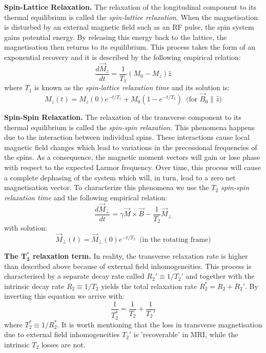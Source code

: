 \hfill

\textbf{Spin-Lattice Relaxation.} The relaxation of the longitudinal component to its thermal equilibrium is called the \textit{spin-lattice relaxation}. 
When the magnetisation is disturbed by an external magnetic field such as an RF pulse, the spin system gains potential energy.
By releasing this energy back to the lattice, the magnetisation then returns to its equilibrium.
This process takes the form of an exponential recovery and it is described by the following empirical relation:
\begin{equation}\label{eq:411}
    \frac{d \vec{M}_{z}}{dt} = \frac{1}{T_1} (M_0 - M_z) \hat{z}
\end{equation}
where $T_1$ is known as the \textit{spin-lattice relaxation time} and its solution is:
\begin{equation}\label{eq:413}
    M_z(t) = M_z(0) e^{-t/T_1} + M_0(1-e^{-t/T_1}) \, \text{ (for } \vec{B}_0 \parallel \hat{z} \text{)}
\end{equation}

\hfill

\textbf{Spin-Spin Relaxation.} The relaxation of the transverse component to its thermal equilibrium is called the \textit{spin-spin relaxation}. 
This phenomena happens due to the interaction between individual spins.
These interactions cause local magnetic field changes which lead to variations in the precessional frequencies of the spins.
As a consequence, the magnetic moment vectors will gain or lose phase with respect to the expected Larmor frequency.
Over time, this process will cause a complete dephasing of the system which will, in turn, lead to a zero net magnetisation vector.
To characterize this phenomena we use the $T_2$ \textit{spin-spin relaxation time} and the following empirical relation:
\begin{equation}\label{eq:412}
    \frac{d \vec{M}_{\perp}}{dt} = \gamma \vec{M} \times \vec{B} - \frac{1}{T_2} \vec{M}_{\perp}
\end{equation}
with solution:
\begin{equation}\label{eq:414}
    \vec{M}_{\perp}(t) = \vec{M}_{\perp}(0) e^{-t/T_2} \, \text{ (in the rotating frame)}
\end{equation}

\hfill

\textbf{The $\mathbf{T_2^*}$ relaxation term.} 
In reality, the transverse relaxation rate is higher than described above because of external field inhomogeneities.
This process is characterised by a separate decay rate called $R_2' \equiv 1/T_2'$ and together with the intrinsic decay rate $R_2 \equiv 1/T_2$ yields the total relaxation rate $R_2^* = R_2 + R_2'$.
By inverting this equation we arrive with:
\begin{equation} \label{eq:420}
    \frac{1}{T_2^*} = \frac{1}{T_2} + \frac{1}{T_2'}
\end{equation}
where ${T_2^*} \equiv 1/R_2^*$.
It is worth mentioning that the loss in transverse magnetisation due to external field inhomogeneities $T_2'$ is 'recoverable' in MRI, while the intrinsic $T_2$ losses are not.

